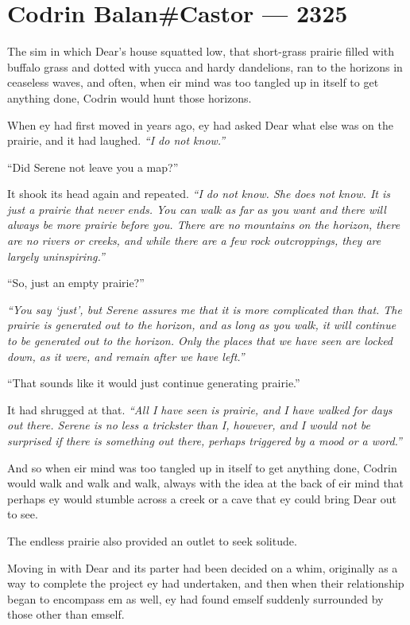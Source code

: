 \hypertarget{codrin-balancastor-2325}{%
\chapter{Codrin Balan\#Castor — 2325}\label{codrin-balancastor-2325}}

The sim in which Dear's house squatted low, that short-grass prairie filled with buffalo grass and dotted with yucca and hardy dandelions, ran to the horizons in ceaseless waves, and often, when eir mind was too tangled up in itself to get anything done, Codrin would hunt those horizons.

When ey had first moved in years ago, ey had asked Dear what else was on the prairie, and it had laughed. \emph{``I do not know.''}

``Did Serene not leave you a map?''

It shook its head again and repeated. \emph{``I do not know. She does not know. It is just a prairie that never ends. You can walk as far as you want and there will always be more prairie before you. There are no mountains on the horizon, there are no rivers or creeks, and while there are a few rock outcroppings, they are largely uninspiring.''}

``So, just an empty prairie?''

\emph{``You say `just', but Serene assures me that it is more complicated than that. The prairie is generated out to the horizon, and as long as you walk, it will continue to be generated out to the horizon. Only the places that we have seen are locked down, as it were, and remain after we have left.''}

``That sounds like it would just continue generating prairie.''

It had shrugged at that. \emph{``All I have seen is prairie, and I have walked for days out there. Serene is no less a trickster than I, however, and I would not be surprised if there is something out there, perhaps triggered by a mood or a word.''}

And so when eir mind was too tangled up in itself to get anything done, Codrin would walk and walk and walk, always with the idea at the back of eir mind that perhaps ey would stumble across a creek or a cave that ey could bring Dear out to see.

The endless prairie also provided an outlet to seek solitude.

Moving in with Dear and its parter had been decided on a whim, originally as a way to complete the project ey had undertaken, and then when their relationship began to encompass em as well, ey had found emself suddenly surrounded by those other than emself.

